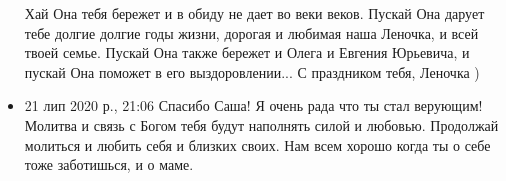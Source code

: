 \begin{itemize}
                Хай Она тебя бережет и в обиду не дает во веки веков. Пускай
                Она дарует тебе долгие долгие годы жизни, дорогая и любимая
                наша Леночка, и всей твоей семье. Пускай Она также бережет и
                Олега и Евгения Юрьевича, и пускай Она поможет в его
                выздоровлении... С праздником тебя, Леночка )
\item 21 лип 2020 р., 21:06 Спасибо Саша! Я очень рада что ты стал верующим!
        Молитва и связь с Богом тебя будут наполнять силой и любовью. Продолжай
                молиться и любить себя и близких своих. Нам всем хорошо когда
                ты о себе тоже заботишься, и о маме.
\end{itemize}

